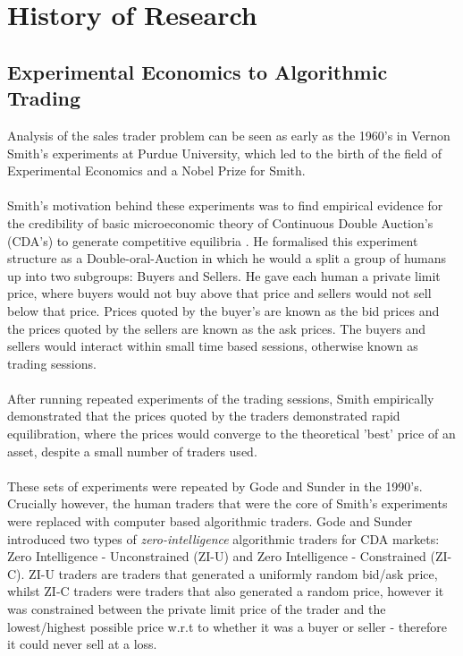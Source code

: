 \documentclass[ %
                    author={Ashwinder Khurana},
                supervisor={Prof Dave Cliff},
                    degree={MEng},
                     title={The Deeply Reinforced Trader},
                  subtitle={},
                      type={enterprise},
                      year={2020} ]{dissertation}
\begin{document}
\section{History of Research}
\subsection{Experimental Economics to Algorithmic Trading}
\label{section:history}
Analysis of the sales trader problem can be seen as early as the 1960's in Vernon Smith's experiments at Purdue University, which led to the birth of the field of Experimental Economics and a Nobel Prize for Smith. 
\\
\\
Smith's motivation behind these experiments was to find empirical evidence for the credibility of basic microeconomic theory of Continuous Double Auction's (CDA's) to generate competitive equilibria \cite{MarketEquilibrium} . He formalised this experiment structure as a Double-oral-Auction in which he would a split a group of humans up into two subgroups: Buyers and Sellers. He gave each human a private limit price, where buyers would not buy above that price and sellers would not sell below that price. Prices quoted by the buyer's are known as the bid prices and the prices quoted by the sellers are known as the ask prices. The buyers and sellers would interact within small time based sessions, otherwise known as trading sessions.
\\
\\
After running repeated experiments of the trading sessions, Smith empirically demonstrated that the prices quoted by the traders demonstrated rapid equilibration, where the prices would converge to the theoretical 'best' price of an asset, despite a small number of traders used.
\\
\\
These sets of experiments were repeated by Gode and Sunder \cite{Gode and Sunder}  in the 1990's. Crucially however, the human traders that were the core of Smith's experiments were replaced with computer based algorithmic traders. Gode and Sunder introduced two types of \textit{zero-intelligence} algorithmic traders for CDA markets: Zero Intelligence - Unconstrained (ZI-U) and Zero Intelligence - Constrained (ZI-C). ZI-U traders are traders that generated a uniformly random bid/ask price, whilst ZI-C traders were traders that also generated a random price, however it was constrained between the private limit price of the trader and the lowest/highest possible price w.r.t to whether it was a buyer or seller - therefore it could never sell at a loss.
\end{document}
